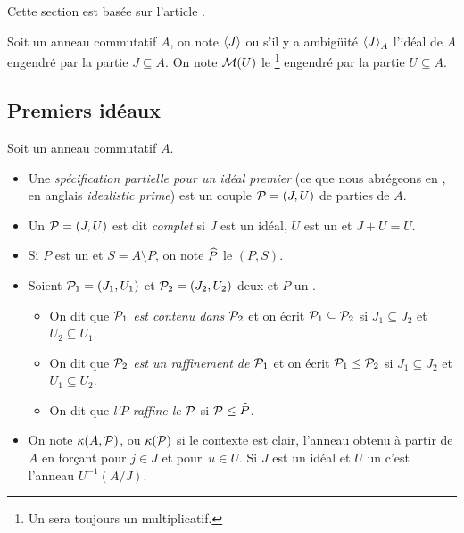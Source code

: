 Cette section est basée sur l'article \cite{lom}.

Soit un anneau commutatif $A$, on note $\left\langle{J}\right\rangle$  ou s'il y a 
ambigüité $\left\langle{J}\right\rangle_A$  l'idéal de $A$ engendré par la partie 
$J\subseteq A$. On note
${\cal M}(U)$ le \mo\footnote{Un \mo sera toujours un \mo multiplicatif.} 
engendré par la partie 
$U\subseteq A$.

\subsection{Premiers idéaux} 
\label{subsecProi}

\begin{definition}{\rm  
\label{defproi1} Soit un anneau commutatif $A$. 
\begin{itemize}
%
\item 
Une {\em spécification partielle pour un idéal premier} (ce que nous 
abrégeons en {\em \proi}, en anglais {\em idealistic prime}) est un 
couple ${\cal P}=(J,U)$ de parties de $A$. 
%
\item Un \proi ${\cal P}=(J,U)$ est dit {\em complet} si $J$ est un  idéal,  
$U$ est un \mo et $J+U=U$. %
%
\item Si $P$ est  un \idep et $S=A\setminus P$, on note $\widehat{P}$ le \proi $(P,S)$.
%
\item Soient ${\cal P}_1=(J_1,U_1)$ et ${\cal P}_2=(J_2,U_2)$  deux \prois et $P$ un \idep.
\begin{itemize}
%
\item On  dit que {\em ${\cal P}_1$ est contenu dans ${\cal P}_2$} et on écrit 
${\cal P}_1\subseteq {\cal P}_2$ si $J_1\subseteq J_2$ et  $U_2\subseteq U_1$.
%
\item  On  dit que  \emph{${\cal P}_2$ est un raffinement de ${\cal P}_1$} et on 
écrit 
${\cal P}_1\leq {\cal P}_2$ si $J_1\subseteq J_2$ et  $U_1\subseteq U_2$.
%
\item  On  dit que  \emph{l'\idep $P$ raffine le \proi ${\cal P}$} si ${\cal P}\leq \widehat{P}$.
%
\end{itemize}
%
\item  On note $\kappa(A,{\cal P})$, ou $\kappa({\cal P})$ si le contexte est clair, l'anneau  obtenu à partir de $A$ en forçant  pour $j\in J$ et  \hbox{pour $u\in U$}. Si $J$ est un idéal et $U$ un \mo c'est l'anneau $U^{-1}(A/J)$. 
%
\end{itemize}
}
\end{definition}

